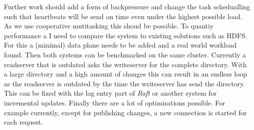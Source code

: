 Further work should add a form of backpressure and change the task schedualling such that heartbeats will be send on time even under the highest possible load. As we use cooperative mutitasking this shoud be possible.
To quantiy performance a I need to compare the system to existing solutions such as HDFS. For this a (minimal) data plane needs to be added and a real world workload found. Then both systems can be benchmarked on the same cluster.
Currently a readserver that is outdated asks the writeserver for the complete directory. With a large directory and a high amount of changes this can result in an endless loop as the readserver is outdated by the time the writeserver has send the directory. This can be fixed with the log entry part of \textit{Raft} or another system for incremental updates.
Finally there are a lot of optimisations possible. For example currently, except for publishing changes, a new connection is started for each request.
